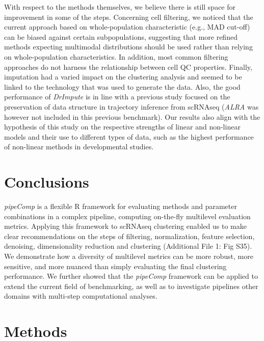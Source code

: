 \documentclass{bmcart}
\begin{document}
With respect to the methods themselves, we believe there is still space for improvement in some of the steps. Concerning cell filtering, we noticed that the current approach based on whole-population characteristic (e.g., MAD cut-off) can be biased against certain subpopulations, suggesting that more refined methods expecting multimodal distributions should be used rather than relying on whole-population characteristics. In addition, most common filtering approaches do not harness the relationship between cell QC properties. Finally, imputation had a varied impact on the clustering analysis and seemed to be linked to the technology that was used to generate the data. Also, the good performance of \textit{DrImpute} is in line with a previous study focused on the preservation of data structure in trajectory inference from scRNAseq \cite{ZhangImput2018} (\textit{ALRA} was however not included in this previous benchmark). Our results also align with the hypothesis of this study on the respective strengths of linear and non-linear models and their use to different types of data, such as the highest performance of non-linear methods in developmental studies. 

\section*{Conclusions}

\textit{pipeComp} is a flexible R framework for evaluating methods and parameter combinations in a complex pipeline, computing on-the-fly multilevel evaluation metrics. Applying this framework to scRNAseq clustering enabled us to make 
clear recommendations on the steps of filtering, normalization, feature selection, denoising, dimensionality reduction and clustering (Additional File 1: Fig S35). We demonstrate how a diversity of multilevel metrics can be more robust, more sensitive, and more nuanced than simply evaluating the final clustering performance. We further showed that the \textit{pipeComp} framework can be applied to extend the current field of benchmarking, as well as to investigate pipelines other domains with multi-step computational analyses.

\section*{Methods}
\end{document}
